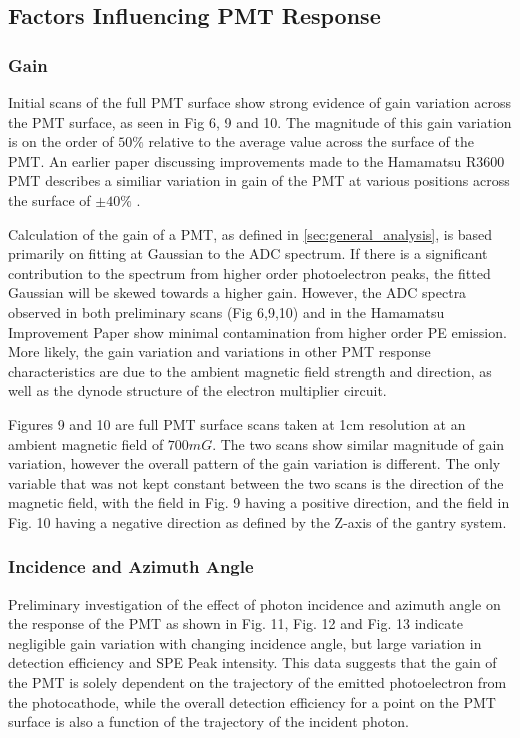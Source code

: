 \documentclass[journal]{IEEEtran}
\begin{document}
\subsection{Factors Influencing PMT Response}	

\subsubsection{Gain}

Initial scans of the full PMT surface show strong evidence of gain variation across the PMT surface, as seen in Fig 6, 9 and 10. The magnitude of this gain variation is on the order of $50\%$ relative to the average value across the surface of the PMT.  An earlier paper discussing improvements made to the Hamamatsu R3600 PMT describes a similiar variation in gain of the PMT at various positions across the surface of $\pm40\%$  \cite{PMTImprovement:suzuki}.

Calculation of the gain of a PMT, as defined in \ref{sec:general_analysis}, is based primarily on fitting at Gaussian to the ADC spectrum.  If there is a significant contribution to the spectrum from higher order photoelectron peaks, the fitted Gaussian will be skewed towards a higher gain.  However, the ADC spectra observed in both preliminary scans (Fig 6,9,10) and in the Hamamatsu Improvement Paper \cite{PMTImprovement:suzuki} show minimal contamination from higher order PE emission. More likely, the gain variation and variations in other PMT response characteristics are due to the ambient magnetic field strength and direction, as well as the dynode structure of the electron multiplier circuit. 

Figures 9 and 10 are full PMT surface scans taken at 1cm resolution at an ambient magnetic field of $700mG$. The two scans show similar magnitude of gain variation, however the overall pattern of the gain variation is different. The only variable that was not kept constant between the two scans is the direction of the magnetic field, with the field in Fig. 9 having a positive direction, and the field in Fig. 10 having a negative direction as defined by the Z-axis of the gantry system.

\subsubsection{Incidence and Azimuth Angle}

Preliminary investigation of the effect of photon incidence and azimuth angle on the response of the PMT as shown in Fig. 11, Fig. 12 and Fig. 13 indicate negligible gain variation with changing incidence angle, but large variation in detection efficiency and SPE Peak intensity.  This data suggests that the gain of the PMT is solely dependent on the trajectory of the emitted photoelectron from the photocathode, while the overall detection efficiency for a point on the PMT surface is also a function of the trajectory of the incident photon.  
\end{document}
